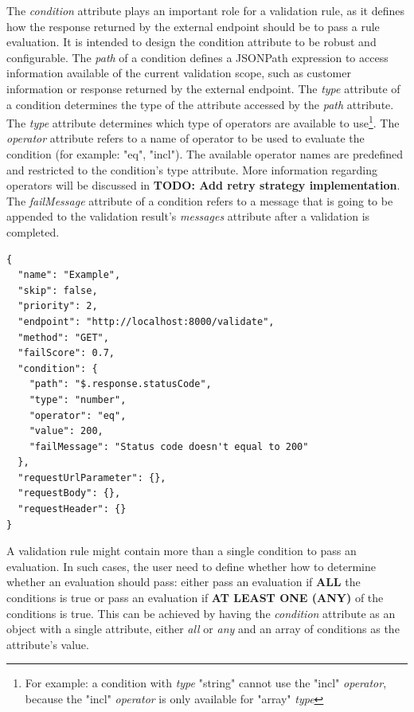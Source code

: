 The \emph{condition} attribute plays an important role for a validation rule, as it defines how the response returned by the external endpoint should be to pass a rule evaluation. It is intended to design the condition attribute to be robust and configurable. The \emph{path} of a condition defines a JSONPath\autocite{Friesen2019} expression to access information available of the current validation scope, such as customer information or response returned by the external endpoint. The \emph{type} attribute of a condition determines the type of the attribute accessed by the \emph{path} attribute. The \emph{type} attribute determines which type of operators are available to use\footnote{For example: a condition with \emph{type} "string" cannot use the "incl" \emph{operator}, because the "incl" \emph{operator} is only available for "array" \emph{type}}. The \emph{operator} attribute refers to a name of operator to be used to evaluate the condition (for example: "eq", "incl"). The available operator names are predefined and restricted to the condition's type attribute. More information regarding operators will be discussed in \textbf{TODO: Add retry strategy implementation}. The \emph{failMessage} attribute of a condition refers to a message that is going to be appended to the validation result's \emph{messages} attribute after a validation is completed.

\newpage
\begin{lstlisting}[caption={Validation rule example (JSON)}]
{
  "name": "Example",
  "skip": false,
  "priority": 2,
  "endpoint": "http://localhost:8000/validate",
  "method": "GET",
  "failScore": 0.7,
  "condition": {
    "path": "$.response.statusCode",
    "type": "number",
    "operator": "eq",
    "value": 200,
    "failMessage": "Status code doesn't equal to 200"
  },
  "requestUrlParameter": {},
  "requestBody": {},
  "requestHeader": {}
}
\end{lstlisting}

A validation rule might contain more than a single condition to pass an evaluation. In such cases, the user need to define whether how to determine whether an evaluation should pass: either pass an evaluation if \textbf{ALL} the conditions is true or pass an evaluation if \textbf{AT LEAST ONE (ANY)} of the conditions is true. This can be achieved by having the \emph{condition} attribute as an object with a single attribute, either \emph{all} or \emph{any} and an array of conditions as the attribute's value.

